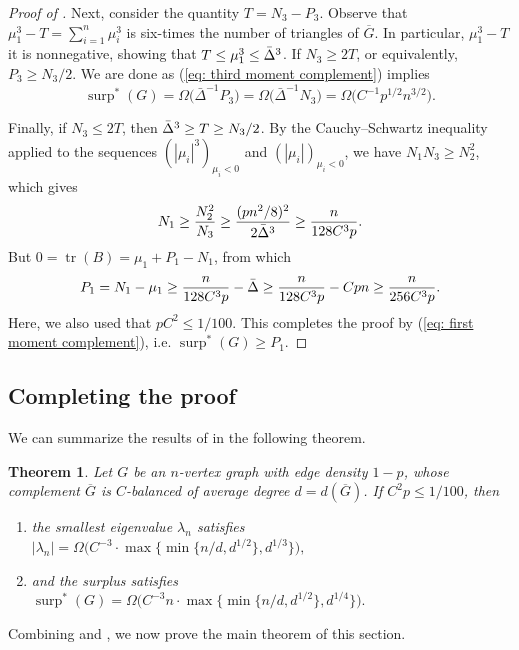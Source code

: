 \documentclass[11pt]{article}
\theoremstyle{plain}
\newtheorem{theorem}{Theorem}[section]
\theoremstyle{definition}
\DeclareMathOperator{\surp}{surp}
\DeclareMathOperator{\trace}{tr}
\begin{document}
\begin{proof}[Proof of ]
    Next, consider the quantity $T=N_3-P_3$. 
    Observe that $\mu_1^3-T=\sum_{i=1}^n\mu_i^3$ is six-times the number of triangles of $\overline{G}$. 
    In particular, $\mu_1^3-T$ it is nonnegative, showing that $T\leq \mu_1^3\leq \Bar{\Delta}^3$.
    If $N_3\geq 2T$, or equivalently, $P_3\geq N_3/2$. 
    We are done as (\ref{eq: third moment complement}) implies $$\surp^*(G)
        = \Omega\Big(\bar{\Delta}^{-1}{P_3}\Big)
        = \Omega\Big(\bar{\Delta}^{-1}{N_3}\Big)
        = \Omega\Big(C^{-1}p^{1/2}n^{3/2}\Big).$$
    
    Finally, if $N_3\leq 2T$, then $\Bar{\Delta}^3\geq T\geq N_3/2$.
    By the Cauchy--Schwartz inequality applied to the sequences $(|\mu_i|^3)_{\mu_i<0}$ and $(|\mu_i|)_{\mu_i<0}$, we have $N_1N_3\geq N_2^2$, which gives 
    $$N_1\geq \frac{N_2^2}{N_3}\geq \frac{(pn^2/8)^2}{2\Bar{\Delta}^3}\geq \frac{n}{128C^3p}.$$
    But $0=\trace(B)=\mu_1+P_1-N_1$, from which $$P_1=N_1-\mu_1\geq \frac{n}{128C^3p}-\Bar{\Delta}\ge \frac{n}{128C^3p} - Cpn \ge \frac{n}{256C^3p}.$$
    Here, we also used that $pC^2 \le 1/100$.
    This completes the proof by (\ref{eq: first moment complement}), i.e. $\surp^*(G)\geq P_1$.
\end{proof}


\subsection{Completing the proof}\label{subsec:concluding dens3}

We can summarize the results of  in the following theorem.

\begin{theorem} \label{theorem: both bounds for balanced graphs}
    Let $G$ be an $n$-vertex graph with edge density $1-p$, whose complement $\overline{G}$ is $C$-balanced of average degree $d=d(\overline{G})$. If $C^2p \le 1/100$, then 
    \begin{enumerate}
        \item[(a)] the smallest eigenvalue $\lambda_n$ satisfies $|\lambda_n| = \Omega\Big(C^{-3}\cdot \max\big\{\min\{n/d, d^{1/2}\}, d^{1/3}\big\}\Big),$
        \item[(b)] and the surplus satisfies $\surp^*(G) = \Omega\Big(C^{-3}n\cdot \max\big\{\min\{n/d, d^{1/2}\}, d^{1/4} \big\}\Big).$
    \end{enumerate}
\end{theorem}

Combining  and , we now prove the main theorem of this section. 
\end{document}
